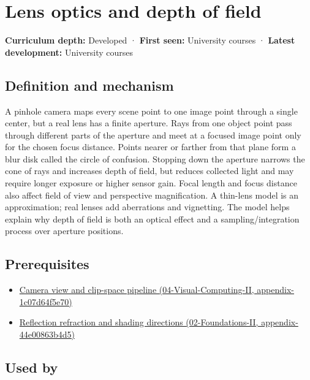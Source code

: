 \hypertarget{appendix-21f8456e2629}{}
\section{Lens optics and depth of field}\label{appendix-21f8456e2629-lens-optics-and-depth-of-field}

\textbf{Curriculum depth:} Developed · \textbf{First seen:} University courses · \textbf{Latest development:} University courses

\subsection{Definition and mechanism}\label{appendix-21f8456e2629-definition-and-mechanism}

A pinhole camera maps every scene point to one image point through a single center, but a real lens has a finite aperture. Rays from one object point pass through different parts of the aperture and meet at a focused image point only for the chosen focus distance. Points nearer or farther from that plane form a blur disk called the circle of confusion. Stopping down the aperture narrows the cone of rays and increases depth of field, but reduces collected light and may require longer exposure or higher sensor gain. Focal length and focus distance also affect field of view and perspective magnification. A thin-lens model is an approximation; real lenses add aberrations and vignetting. The model helps explain why depth of field is both an optical effect and a sampling/integration process over aperture positions.

\subsection{Prerequisites}\label{appendix-21f8456e2629-prerequisites}

\begin{itemize}
\tightlist
\item
  \href{../04-Visual-Computing-II/main.pdf\#nameddest=appendix-1c07d64f5e70}{Camera view and clip-space pipeline (04-Visual-Computing-II, appendix-1c07d64f5e70)}
\item
  \href{../02-Foundations-II/main.pdf\#nameddest=appendix-44e00863b4d5}{Reflection refraction and shading directions (02-Foundations-II, appendix-44e00863b4d5)}
\end{itemize}

\subsection{Used by}\label{appendix-21f8456e2629-used-by}

